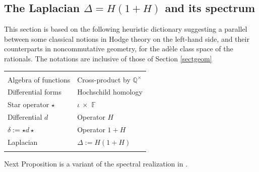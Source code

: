 \documentclass{pspum-l}
\theoremstyle{definition}
\theoremstyle{remark}
\numberwithin{equation}{section}
\def\F{{\mathbb F}}
\def\Q{{\mathbb Q}}
\def\fourier{\F}
\begin{document}
\subsection{The Laplacian $\Delta=H(1+H)$ and its spectrum}

This section is based on the following heuristic dictionary suggesting a parallel  between some classical notions in Hodge theory on the left-hand side,  and their counterparts in noncommutative geometry, for the ad\`ele class space of the rationals. The notations  are inclusive of those of Section \ref{sectgeom}
\begin{large}
\begin{center}
\begin{tabular}{l | l}
& \\
Algebra of functions & Cross-product by $\Q^\times$ \\
Differential forms  & Hochschild homology\\
Star operator $\star$ & $\iota\ \times $ $\fourier$ \\ 
 Differential $d$  & Operator $H$  \\
$\delta:= \star d \star$ & Operator $1+H$   \\
Laplacian  & $\Delta:=H(1+H)$ \\
&
\end{tabular}
\end{center}
\end{large}
Next Proposition is a variant of the spectral realization in  \cite{CCM2,CMbook}.
\end{document}
